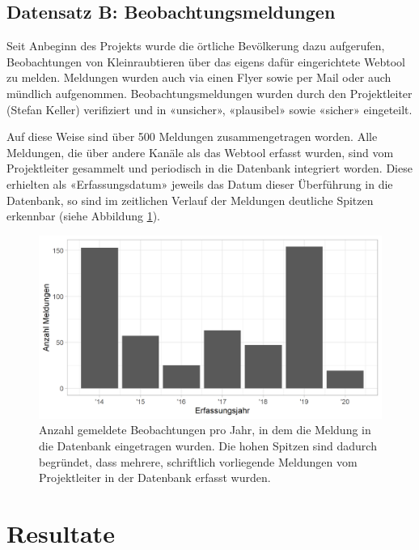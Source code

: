 \documentclass[
]{scrbook}
\begin{document}
\hypertarget{datensatz-b-beobachtungsmeldungen}{%
\section{Datensatz B: Beobachtungsmeldungen}\label{datensatz-b-beobachtungsmeldungen}}

Seit Anbeginn des Projekts wurde die örtliche Bevölkerung dazu aufgerufen, Beobachtungen von Kleinraubtieren über das eigens dafür eingerichtete Webtool zu melden. Meldungen wurden auch via einen Flyer sowie per Mail oder auch mündlich aufgenommen. Beobachtungsmeldungen wurden durch den Projektleiter (Stefan Keller) verifiziert und in «unsicher», «plausibel» sowie «sicher» eingeteilt.

Auf diese Weise sind über 500 Meldungen zusammengetragen worden. Alle Meldungen, die über andere Kanäle als das Webtool erfasst wurden, sind vom Projektleiter gesammelt und periodisch in die Datenbank integriert worden. Diese erhielten als «Erfassungsdatum» jeweils das Datum dieser Überführung in die Datenbank, so sind im zeitlichen Verlauf der Meldungen deutliche Spitzen erkennbar (siehe Abbildung \ref{fig:beobachtungsmeldungenhistogramm}).



\begin{figure}
\includegraphics[width=1\linewidth]{images/beobachtungsmeldungen_histogramm} \caption{Anzahl gemeldete Beobachtungen pro Jahr, in dem die Meldung in die Datenbank eingetragen wurden. Die hohen Spitzen sind dadurch begründet, dass mehrere, schriftlich vorliegende Meldungen vom Projektleiter in der Datenbank erfasst wurden.}\label{fig:beobachtungsmeldungenhistogramm}
\end{figure}

\hypertarget{resultate}{%
\chapter{Resultate}\label{resultate}}
\end{document}
